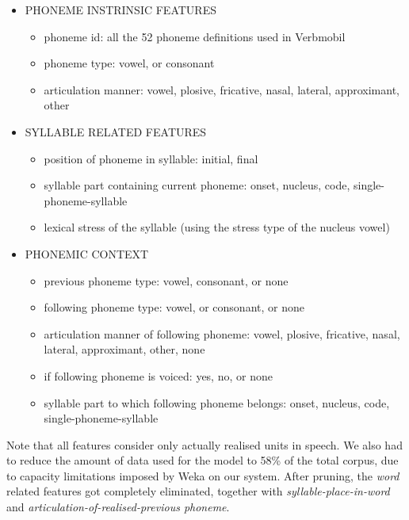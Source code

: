 \documentclass[a4paper]{scrreprt}
\begin{document}
\begin{itemize}
	\item PHONEME INSTRINSIC FEATURES

	\begin{itemize}
		\item phoneme id: all the 52 phoneme definitions used in Verbmobil
		\item phoneme type: vowel, or consonant
		\item articulation manner: vowel, plosive, fricative, nasal, lateral, approximant, other
	\end{itemize}

	\item SYLLABLE RELATED FEATURES

	\begin{itemize}
		\item position of phoneme in syllable: initial, final
		\item syllable part containing current phoneme: onset, nucleus, code, single-phoneme-syllable
		\item lexical stress of the syllable (using the stress type of the nucleus vowel)
	\end{itemize}

	\item PHONEMIC CONTEXT

	\begin{itemize}
		\item previous phoneme type: vowel, consonant, or none
		\item following phoneme type: vowel, or consonant, or none
		\item articulation manner of following phoneme: vowel, plosive, fricative, nasal, lateral, approximant, other, none
		\item if following phoneme is voiced: yes, no, or none
		\item syllable part to which following phoneme belongs: onset, nucleus, code, single-phoneme-syllable
	\end{itemize}
\end{itemize}

Note that all features consider only actually realised units in speech. We also had to reduce the amount of data used for the model to 58\% of the total corpus, due to capacity limitations imposed by Weka on our system.
After pruning, the \textit{word} related features got completely eliminated, together with \textit{syllable-place-in-word} and \textit{articulation-of-realised-previous phoneme}. 
\end{document}
